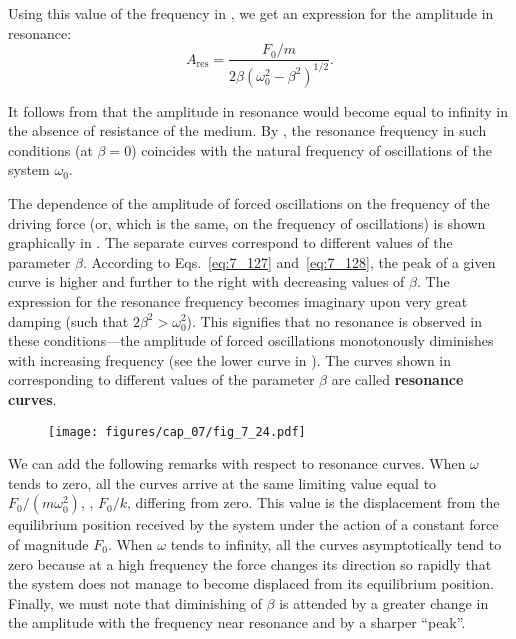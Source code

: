 \noindent
Using this value of the frequency in , we get an expression for the amplitude in resonance:
\begin{equation}\label{eq:7_128}
	A_{\text{res}} = \frac{F_0/m}{2\beta \left( \omega_0^2 - \beta^2\right)^{1/2}}.
\end{equation}

\noindent
It follows from  that the amplitude in resonance would become equal to infinity in the absence of resistance of the medium. By , the resonance frequency in such conditions (at $\beta=0$) coincides with the natural frequency of oscillations of the system $\omega_0$.

The dependence of the amplitude of forced oscillations on the frequency of the driving force (or, which is the same, on the frequency of oscillations) is shown graphically in . The separate curves correspond to different values of the parameter $\beta$. According to Eqs.~\eqref{eq:7_127} and~\eqref{eq:7_128}, the peak of a given curve is higher and further to the right with decreasing values of $\beta$. The expression for the resonance frequency becomes imaginary upon very great damping (such that $2\beta^2>\omega_0^2$). This signifies that no resonance is observed in these conditions---the amplitude of forced oscillations monotonously diminishes with increasing frequency (see the lower curve in ). The curves shown in  corresponding to different values of the parameter $\beta$ are called \textbf{resonance curves}.

\begin{figure}[t]
	\begin{center}
		\texttt{[image: figures/cap\_07/fig\_7\_24.pdf]}
		\caption[]{}
		\label{fig:7_24}
	\end{center}
	\vspace{-0.8cm}
\end{figure}

We can add the following remarks with respect to resonance curves. When $\omega$ tends to zero, all the curves arrive at the same limiting value equal to $F_0/(m\omega_0^2)$, \ie, $F_0/k$, differing from zero. This value is the displacement from the equilibrium position received by the system under the action of a constant force of magnitude $F_0$. When $\omega$ tends to infinity, all the curves asymptotically tend to zero because at a high frequency the force changes its direction so rapidly that the system does not manage to become displaced from its equilibrium position. Finally, we must note that diminishing of $\beta$ is attended by a greater change in the amplitude with the frequency near resonance and by a sharper ``peak''.


